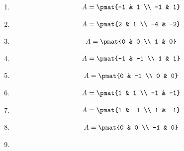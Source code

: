 \begin{enumerate}

\item

\begin{align*}
A = \pmat{-1 & 1 \\ -1 & 1}
\end{align*}

\item

\begin{align*}
A = \pmat{2 & 1 \\ -4 & -2}
\end{align*}

\item

\begin{align*}
A = \pmat{0 & 0 \\ 1 & 0}
\end{align*}

\item

\begin{align*}
A = \pmat{-1 & -1 \\ 1 & 1}
\end{align*}

\item

\begin{align*}
A = \pmat{0 & -1 \\ 0 & 0}
\end{align*}

\item

\begin{align*}
A = \pmat{1 & 1 \\ -1 & -1}
\end{align*}

\item

\begin{align*}
A = \pmat{1 & -1 \\ 1 & -1}
\end{align*}

\item

\begin{align*}
A = \pmat{0 & 0 \\ -1 & 0}
\end{align*}

\item


\end{enumerate}
